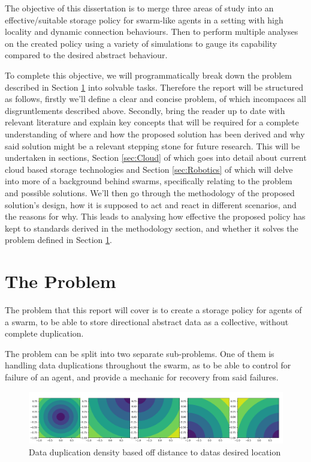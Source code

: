 \documentclass{UoYCSproject}
\begin{document}
The objective of this dissertation is to merge three areas of study into an effective/suitable storage policy for swarm-like agents in a setting with high locality and dynamic connection behaviours.
Then to perform multiple analyses on the created policy using a variety of simulations to gauge its capability compared to the desired abstract behaviour.

To complete this objective, we will programmatically break down the problem described in Section \ref{sec:Problem} into solvable tasks.
Therefore the report will be structured as follows, firstly we’ll define a clear and concise problem, of which incompaces all disgruntlements described above.
Secondly, bring the reader up to date with relevant literature and explain key concepts that will be required for a complete understanding of where and how the proposed solution has been derived and why said solution might be a relevant stepping stone for future research.
This will be undertaken in sections, Section \ref{sec:Cloud} of which goes into detail about current cloud based storage technologies and Section \ref{sec:Robotics} of which will delve into more of a background behind swarms, specifically relating to the problem and possible solutions.
We’ll then go through the methodology of the proposed solution’s design, how it is supposed to act and react in different scenarios, and the reasons for why.
This leads to analysing how effective the proposed policy has kept to standards derived in the methodology section, and whether it solves the problem defined in Section \ref{sec:Problem}.


\section{The Problem}
\label{sec:Problem}

The problem that this report will cover is to create a storage policy for agents of a swarm, to be able to store directional abstract data as a collective, without complete duplication.

The problem can be split into two separate sub-problems.
One of them is handling data duplications throughout the swarm, as to be able to control for failure of an agent, and provide a mechanic for recovery from said failures.

\begin{figure}[htb]
\label{fig:popdensity}
\begin{center}
\centering
\includegraphics[width=\linewidth]{"./ExplanationImgs/Memory_Pop_Density.png"}
\caption{Data duplication density based off distance to datas desired location}
\end{center}
\end{figure}
\end{document}
